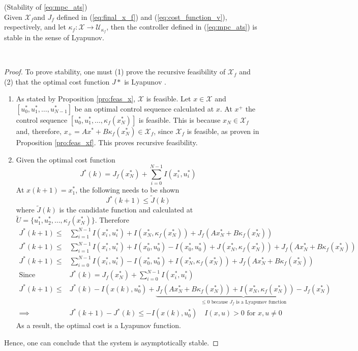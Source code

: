  


\begin{proposition}{(Stability of \ref{eq:mpc_ats})}\\

	Given $\mathcal{X}_f$and $J_f$ defined in (\ref{eq:final_x_f}) and (\ref{eq:cost_function_v}), respectively, and let $\kappa_f:\mathcal{X}\rightarrow\mathcal{U}_{\kappa_f}$, then the controller defined in (\ref{eq:mpc_ats}) is stable in the sense of Lyapunov.
\end{proposition}\\
\begin{proof}
 To prove stability, one must (1) prove the recursive feasibility of $\mathcal{X}_f$ and (2) that the optimal cost function $J*$ is Lyapunov .
\begin{enumerate}
	\item As stated by Proposition \ref{pro:feas_x}, $\mathcal{X}$ is feasible. Let $x\in \mathcal{X}$ and $[u^*_0, u^*_1, \dots, u^*_{N-1}]$ be an optimal control sequence calculated at $x$. At $x^+$ the control sequence $[u^*_0, u^*_1, \dots, \kappa_f(x^*_N)]$ is feasible. This is because $x_N\in \mathcal{X}_f$ and, therefore, $x_+=Ax^*+B\kappa_f(x^*_N) \in \mathcal{X}_f$, since $\mathcal{X}_f$ is feasible, as proven in Proposition \ref{pro:feas_xf}. This proves recursive feasibility.
	\item Given the optimal cost function
	\begin{equation*}
	J^*(k) = J_f(x^*_N)+\sum_{i=0}^{N-1}I(x^*_i, u^*_i)
	\end{equation*}
	At $x(k+1) = x^*_1$, the following needs to be shown
	\begin{equation*}
		J^*(k+1) \leq \widetilde{J}(k)
	\end{equation*}
	where $\widetilde{J}(k)$ is the candidate function and calculated at $\widetilde{U} = \{u^*_1, u^*_2, \dots, \kappa_f(x^*_N)\}$. Therefore
	\begin{align*}
		J^*(k+1) \leq& \sum_{i=1}^{N-1}I(x^*_i, u^*_i) + I(x^*_N, \kappa_f(x^*_N)) + J_f(Ax^*_N + B \kappa_f(x^*_N))\\
		J^*(k+1) \leq& \sum_{i=1}^{N-1}I(x^*_i, u^*_i) +I(x^*_0, u^*_0)-I(x^*_0, u^*_0) + J(x^*_N, \kappa_f(x^*_N)) + J_f(Ax^*_N + B \kappa_f(x^*_N))\\
		J^*(k+1) \leq& \sum_{i=0}^{N-1}I(x^*_i, u^*_i) -I(x^*_0, u^*_0) + I(x^*_N, \kappa_f(x^*_N)) + J_f(Ax^*_N + B \kappa_f(x^*_N))\\
		\text{Since }&J^*(k) = J_f(x^*_N)+\sum_{i=0}^{N-1}I(x^*_i, u^*_i)\\
		J^*(k+1) \leq& J^*(k) -I(x(k), u^*_0)+ \underset{\leq 0 \text{ because $J_f$ is a Lyapunov function}}{\underbrace{J_f(Ax^*_N + B \kappa_f(x^*_N)) + I(x^*_N, \kappa_f(x^*_N)) - J_f(x^*_N)}}\\
		\implies& J^*(k+1) - J^*(k) \leq -I(x(k), u^*_0) \quad I(x,u) >0 \text{ for }x,u \neq 0
	\end{align*}
	As a result, the optimal cost is a Lyapunov function. \\
\end{enumerate}
Hence, one can conclude that the system is asymptotically stable. 
\end{proof}



